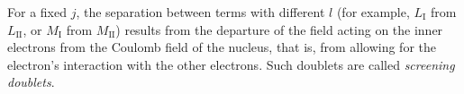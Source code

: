 For a fixed $j$, the separation between terms with different $l$ (for example, $L_{\mathrm I}$ from $L_{\mathrm{II}}$, or $M_{\mathrm I}$ from $M_{\mathrm{II}}$) results from the departure of the field acting on the inner electrons from the Coulomb field of the nucleus, that is, from allowing for the electron's interaction with the other electrons. Such doublets are called \emph{screening doublets}.
